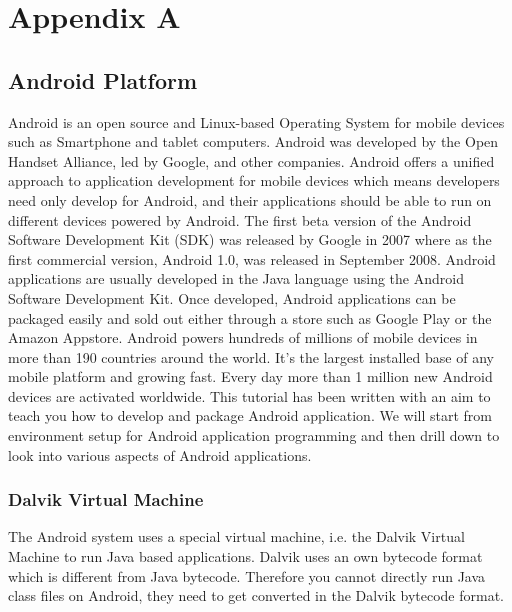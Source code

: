 \documentclass{SureshLimkar}
\begin{document}

\chapter{Appendix A}

\section{Android Platform}

\hspace{0.5 in}Android is an open source and Linux-based Operating System for mobile devices such as Smartphone and tablet computers. Android was developed by the Open Handset Alliance, led by Google, and other companies. Android offers a unified approach to application development for mobile devices which means developers need only develop for Android, and their applications should be able to run on different devices powered by Android. The first beta version of the Android Software Development Kit (SDK) was released by Google in 2007 where as the first commercial version, Android 1.0, was released in September 2008.
\hspace{0.5 in}Android applications are usually developed in the Java language using the Android Software Development Kit. Once developed, Android applications can be packaged easily and sold out either through a store such as Google Play or the Amazon Appstore. Android powers hundreds of millions of mobile devices in more than 190 countries around the world. It's the largest installed base of any mobile platform and growing fast. Every day more than 1 million new Android devices are activated worldwide. This tutorial has been written with an aim to teach you how to develop and package Android application. We will start from environment setup for Android application programming and then drill down to look into various aspects of Android applications.


\subsection{Dalvik Virtual Machine}
\hspace{0.5 in}The Android system uses a special virtual machine, i.e. the Dalvik Virtual Machine to run Java based applications. Dalvik uses an own bytecode format which is different from Java bytecode. Therefore you cannot directly run Java class files on Android, they need to get converted in the Dalvik bytecode format.
\end{document}
